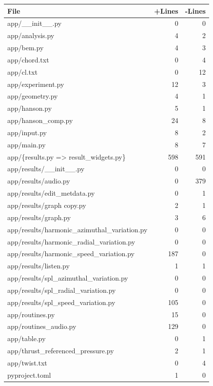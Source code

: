 \documentclass{article}
\begin{document}
\begin{longtable}{|p{10cm}|r|r|}
\hline \textbf{File} & \textbf{+Lines} & \textbf{-Lines} \\
\hline
app/\_\_init\_\_.py & 0 & 0 \\
\hline
app/analysis.py & 4 & 2 \\
\hline
app/bem.py & 4 & 3 \\
\hline
app/chord.txt & 0 & 4 \\
\hline
app/cl.txt & 0 & 12 \\
\hline
app/experiment.py & 12 & 3 \\
\hline
app/geometry.py & 4 & 1 \\
\hline
app/hanson.py & 5 & 1 \\
\hline
app/hanson\_comp.py & 24 & 8 \\
\hline
app/input.py & 8 & 2 \\
\hline
app/main.py & 8 & 7 \\
\hline
app/\{results.py => result\_widgets.py\} & 598 & 591 \\
\hline
app/results/\_\_init\_\_.py & 0 & 0 \\
\hline
app/results/audio.py & 0 & 379 \\
\hline
app/results/edit\_metdata.py & 0 & 1 \\
\hline
app/results/graph copy.py & 2 & 1 \\
\hline
app/results/graph.py & 3 & 6 \\
\hline
app/results/harmonic\_azimuthal\_variation.py & 0 & 0 \\
\hline
app/results/harmonic\_radial\_variation.py & 0 & 0 \\
\hline
app/results/harmonic\_speed\_variation.py & 187 & 0 \\
\hline
app/results/listen.py & 1 & 1 \\
\hline
app/results/spl\_azimuthal\_variation.py & 0 & 0 \\
\hline
app/results/spl\_radial\_variation.py & 0 & 0 \\
\hline
app/results/spl\_speed\_variation.py & 105 & 0 \\
\hline
app/routines.py & 15 & 0 \\
\hline
app/routines\_audio.py & 129 & 0 \\
\hline
app/table.py & 0 & 1 \\
\hline
app/thrust\_referenced\_pressure.py & 2 & 1 \\
\hline
app/twist.txt & 0 & 4 \\
\hline
pyproject.toml & 1 & 0 \\
\hline
\end{longtable}
\end{document}
